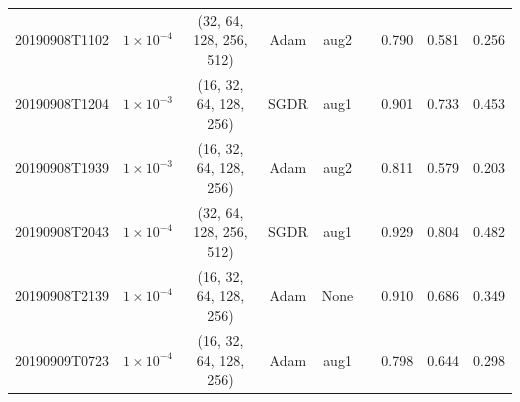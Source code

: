 \begin{table}[!ht]
\begin{adjustbox}{width=\columnwidth, center}
\begin{tabular}{ccccccccc}
			20190908T1102                        & $1\times10^{-4}$                                 & (32, 64, 128, 256, 512)                     & Adam                                & aug2                                                                                      & \xmark                                                                                     & 0.790          & 0.581          & 0.256          \\
			20190908T1204                        & $1\times10^{-3}$                                  & (16, 32, 64, 128, 256)                      & SGDR                                & aug1                                                                                      & \cmark                                                                                     & 0.901          & 0.733          & 0.453          \\
			20190908T1939                        & $1\times10^{-3}$                                  & (16, 32, 64, 128, 256)                      & Adam                                & aug2                                                                                      & \xmark                                                                                     & 0.811          & 0.579          & 0.203          \\
			20190908T2043                        & $1\times10^{-4}$                                 & (32, 64, 128, 256, 512)                     & SGDR                                & aug1                                                                                      & \cmark                                                                                     & 0.929          & 0.804          & 0.482          \\
			20190908T2139                        & $1\times10^{-4}$                                 & (16, 32, 64, 128, 256)                      & Adam                                & None                                                                                      & \xmark                                                                                     & 0.910          & 0.686          & 0.349          \\
			20190909T0723                        & $1\times10^{-4}$                                 & (16, 32, 64, 128, 256)                      & Adam                                & aug1                                                                                      & \xmark                                                                                     & 0.798          & 0.644          & 0.298          \\

\end{tabular}
\end{adjustbox}
\end{table}
